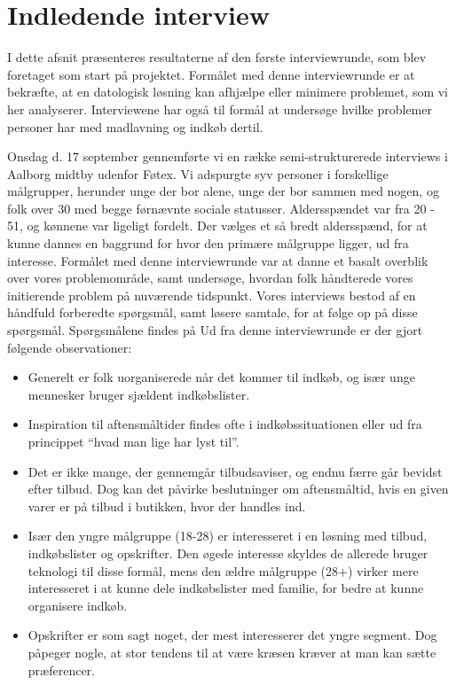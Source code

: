 \section{Indledende interview}\label{section:interview1}
I dette afsnit præsenteres resultaterne af den første interviewrunde, som blev foretaget som start på projektet.
Formålet med denne interviewrunde er at bekræfte, at en datologisk løsning kan afhjælpe eller minimere problemet, som vi her analyserer.
Interviewene har også til formål at undersøge hvilke problemer personer har med madlavning og indkøb dertil.

Onsdag d. 17 september gennemførte vi en række semi-strukturerede interviews i Aalborg midtby udenfor Føtex.
Vi adspurgte syv personer i forskellige målgrupper, herunder unge der bor alene, unge der bor sammen med nogen, og folk over 30 med begge førnævnte sociale statusser.
Aldersspændet var fra 20 - 51, og kønnene var ligeligt fordelt.
Der vælges et så bredt aldersspænd, for at kunne dannes en baggrund for hvor den primære målgruppe ligger, ud fra interesse.
Formålet med denne interviewrunde var at danne et basalt overblik over vores problemområde, samt undersøge, hvordan folk håndterede vores initierende problem på nuværende tidspunkt.
Vores interviews bestod af en håndfuld forberedte spørgsmål, samt løsere samtale, for at følge op på disse spørgsmål.
Spørgsmålene findes på 
Ud fra denne interviewrunde er der gjort følgende observationer:
\begin{itemize}
	\item Generelt er folk uorganiserede når det kommer til indkøb, og især unge mennesker bruger sjældent indkøbslister.
	\item Inspiration til aftensmåltider findes ofte i indkøbssituationen eller ud fra princippet “hvad man lige har lyst til”.
	\item Det er ikke mange, der gennemgår tilbudsaviser, og endnu færre går bevidst efter tilbud.
	Dog kan det påvirke beslutninger om aftensmåltid, hvis en given varer er på tilbud i butikken, hvor der handles ind.
	\item Især den yngre målgruppe (18-28) er interesseret i en løsning med tilbud, indkøbslister og opskrifter. Den øgede interesse skyldes de allerede bruger teknologi til disse formål, mens den ældre målgruppe (28+) virker mere interesseret i at kunne dele indkøbslister med familie, for bedre at kunne organisere indkøb.
	\item Opskrifter er som sagt noget, der mest interesserer det yngre segment.
	Dog påpeger nogle, at stor tendens til at være kræsen kræver at man kan sætte præferencer.
\end{itemize}

